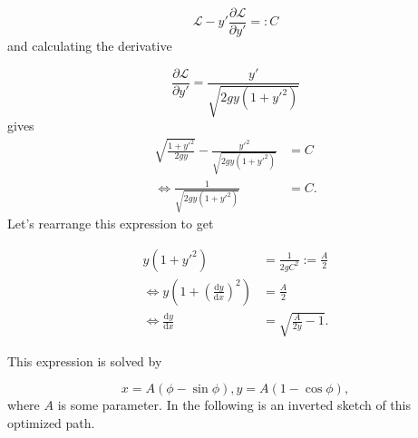 \documentclass[12pt,a4paper]{exam}
\begin{document}
    \begin{equation}
      \mathcal{L} -   y' \frac{\partial \mathcal{L}}{\partial y'} =: C
    \end{equation}
  and calculating the derivative
  
    \begin{equation}
      \frac{\partial \mathcal{L}}{\partial y'} = \frac{y'}{\sqrt{2gy\left(1+y'^2\right)}}
    \end{equation}
  gives 
    \begin{equation}
      \begin{split}
        \sqrt{\frac{1 + y'^2}{2gy}} - \frac{y'^2}{\sqrt{2gy\left(1+y'^2\right)}} &= C \\
        \Leftrightarrow \frac{1}{\sqrt{2gy\left(1+y'^2\right)}} &= C.
      \end{split}
    \end{equation}
  Let's rearrange this expression to get
  
    \begin{equation}
      \begin{split}
        y \left(1 + y'^2\right) &= \frac{1}{2gC^2} := \frac{A}{2} \\
        \Leftrightarrow y \left(1 + \left(\frac{\text{d} y}{\text{d} x}\right)^2\right) &= \frac{A}{2}  \\
        \Leftrightarrow \frac{\text{d} y}{\text{d} x} &= \sqrt{\frac{A}{2y} - 1}.
      \end{split}
    \end{equation}
    
  This expression is solved by 
    
    \begin{equation}
      x = A \left(\phi - \sin \phi \right), y = A \left(1 - \cos \phi \right),
    \end{equation}
  where $A$ is some parameter. In the following is an inverted sketch of this optimized path.
  
  \begin{center}
  \end{center}
  
  
  
\end{document}
